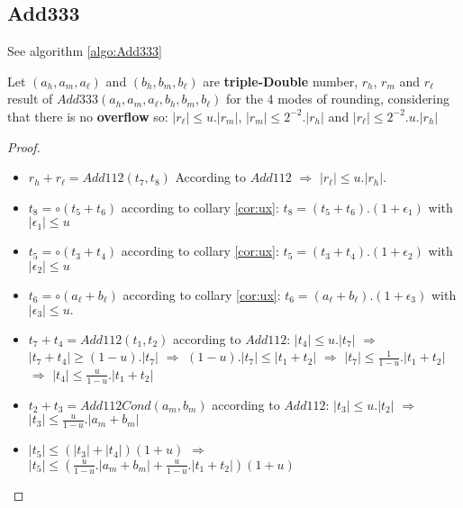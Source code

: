 \subsection{Add333}
See algorithm \ref{algo:Add333}
\begin{lem}[Add333] Let $(a_h, a_m, a_{\ell})$ and $(b_h, b_m, b_{\ell})$ are   \textbf{triple-Double} number, $r_h$, $r_m$ and  $r_{\ell}$ result of $Add333(a_h, a_m,a_{\ell},b_h,b_m,b_{\ell})$ for the $4$ modes of rounding, considering that there is no \textbf{overflow} so: $ \lvert r_{\ell} \rvert \le u. \lvert r_m \rvert$, $\lvert r_m \rvert \le 2^{-2}.\lvert r_h \rvert$ and $\lvert r_{\ell} \rvert \le 2^{-2}.u.\lvert r_h \rvert$

\end{lem}

\begin{proof} \color{-yellow}
\begin{itemize}
    \item $r_h+r_{\ell} = Add112(t_7,t_8)$ According to $Add112$ $\Rightarrow$ $\lvert r_{\ell} \rvert \le u. \lvert r_h \rvert$.
    \item $t_8 = \circ (t_5 + t_6)$ according to collary \ref{cor:ux}: $t_8 = (t_5 +t_6).(1 + \epsilon_1)$ with $\lvert \epsilon_1 \rvert \le u $
    \item $t_5 =\circ (t_3 + t_4)$ according to collary \ref{cor:ux}: $t_5 = (t_3 +t_4).(1 +\epsilon_2)$ with $\lvert \epsilon_2 \rvert \le u$
    \item $t_6 =\circ (a_{\ell}+b_{\ell})$ according to collary \ref{cor:ux}: $t_6 = (a_{\ell}+b_{\ell}).(1 +\epsilon_3)$ with $\lvert \epsilon_3 \rvert \le u.$
    \item $t_7 + t_4 = Add112(t_1, t_2)$ according to $Add112$: $ \lvert t_4 \rvert \le u.\lvert t_7 \rvert $ $\Rightarrow$ $\lvert t_7 + t_4 \rvert \ge (1-u). \lvert t_7 \rvert$  $\Rightarrow$ $(1-u). \lvert t_7 \rvert \le \lvert t_1 + t_2 \rvert$ $\Rightarrow$ $\lvert t_7 \rvert \le \frac{1}{1-u}.\lvert t_1 + t_2 \rvert$ $\Rightarrow$ $\lvert t_4 \rvert \le \frac{u}{1-u}.\lvert t_1 + t_2 \rvert$
    \item $t_2 + t_3 = Add112Cond(a_m,b_m)$ according to $Add112$: $ \lvert t_3 \rvert \le u.\lvert t_2 \rvert $ $\Rightarrow$ $\lvert t_3 \rvert \le \frac{u}{1-u}. \lvert a_m +b_m \rvert$ 
    \item $\lvert t_5 \rvert \le (\lvert t_3 \rvert + \lvert t_4 \rvert)(1+u)$ $\Rightarrow$
$\lvert t_5 \rvert \le (\frac{u}{1-u}. \lvert a_m +b_m \rvert + \frac{u}{1-u}.\lvert t_1 + t_2 \rvert)(1+u)$ 

\end{itemize}
\end{proof}

